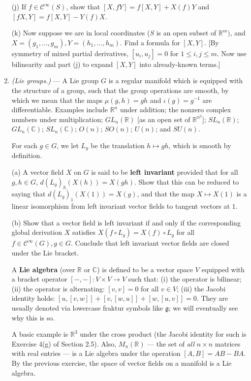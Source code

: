 \documentclass[leqno]{book}
\begin{document}
\begin{enumerate}
(j) If $f\in\mathcal C^\infty(S)$, show that $[X,fY]=f[X,Y]+X(f)Y$ and $[fX,Y]=f[X,Y]-Y(f)X$.

(k) Now suppose we are in local coordinates ($S$ is an open subset of $\mathbb R^m)$, and $X=(g_1,\dots,g_m),Y=(h_1,\dots,h_m)$.  Find a formula for $[X,Y]$.  [By symmetry of mixed partial derivatives, $[u_i,u_j]=0$ for $1\leqslant i,j\leqslant m$.  Now use bilinearity and part (j) to expand $[X,Y]$ into already-known terms.]

\item\emph{(Lie groups.)} \---- A Lie group $G$ is a regular manifold which is equipped with the structure of a group, such that the group operations are smooth, by which we mean that the maps $\mu(g,h)=gh$ and $\iota(g)=g^{-1}$ are differentiable. %
Examples include $\mathbb R^n$ under addition; the nonzero complex numbers under multiplication; $GL_n(\mathbb R)$ [as an open set of $\mathbb R^{n^2}$]; $SL_n(\mathbb R)$; $GL_n(\mathbb C)$; $SL_n(\mathbb C)$; $O(n)$; $SO(n)$; $U(n)$; and $SU(n)$.

For each $g\in G$, we let $L_g$ be the translation $h\mapsto gh$, which is smooth by definition.

(a) A vector field $X$ on $G$ is said to be \textbf{left invariant} provided that for all $g,h\in G$, $d(L_g)_h(X(h))=X(gh)$.  Show that this can be reduced to saying that $d(L_g)_1(X(1))=X(g)$, and that the map $X\mapsto X(1)$ is a linear isomorphism from left invariant vector fields to tangent vectors at $1$.

(b) Show that a vector field is left invariant if and only if the corresponding global derivation $X$ satisfies $X(f\circ L_g)=X(f)\circ L_g$ for all $f\in\mathcal C^\infty(G),g\in G$.  Conclude that left invariant vector fields are closed under the Lie bracket.

A \textbf{Lie algebra} (over $\mathbb R$ or $\mathbb C$) is defined to be a vector space $V$ equipped with a bracket operator $[-,-]:V\times V\to V$ such that: (i) the operator is bilinear; (ii) the operator is alternating: $[v,v]=0$ for all $v\in V$; (iii) the Jacobi identity holds: $[u,[v,w]]+[v,[w,u]]+[w,[u,v]]=0$.  They are usually denoted via lowercase fraktur symbols like $\mathfrak g$; we will eventually see why this is so.

A basic example is $\mathbb R^3$ under the cross product (the Jacobi identity for such is Exercise 4(g) of Section 2.5).  Also, $M_n(\mathbb R)$ \---- the set of \emph{all} $n\times n$ matrices with real entries \---- is a Lie algebra under the operation $[A,B]=AB-BA$.  By the previous exercise, the space of vector fields on a manifold is a Lie algebra.


\end{enumerate}
\end{document}
